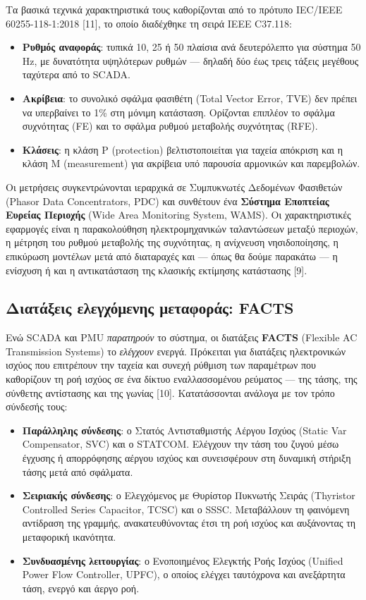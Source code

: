 Τα βασικά τεχνικά χαρακτηριστικά τους καθορίζονται από το πρότυπο IEC/IEEE 60255-118-1:2018 [11],
το οποίο διαδέχθηκε τη σειρά IEEE C37.118:

\begin{itemize}
\item \textbf{Ρυθμός αναφοράς}: τυπικά 10, 25 ή 50 πλαίσια ανά δευτερόλεπτο για σύστημα 50 Hz,
      με δυνατότητα υψηλότερων ρυθμών — δηλαδή δύο έως τρεις τάξεις μεγέθους ταχύτερα από το SCADA.
\item \textbf{Ακρίβεια}: το συνολικό σφάλμα φασιθέτη (Total Vector Error, TVE) δεν πρέπει να
      υπερβαίνει το 1\% στη μόνιμη κατάσταση. Ορίζονται επιπλέον το σφάλμα συχνότητας (FE) και
      το σφάλμα ρυθμού μεταβολής συχνότητας (RFE).
\item \textbf{Κλάσεις}: η κλάση P (protection) βελτιστοποιείται για ταχεία απόκριση και η κλάση M
      (measurement) για ακρίβεια υπό παρουσία αρμονικών και παρεμβολών.
\end{itemize}

Οι μετρήσεις συγκεντρώνονται ιεραρχικά σε Συμπυκνωτές Δεδομένων Φασιθετών (Phasor Data
Concentrators, PDC) και συνθέτουν ένα \textbf{Σύστημα Εποπτείας Ευρείας Περιοχής} (Wide Area
Monitoring System, WAMS). Οι χαρακτηριστικές εφαρμογές είναι η παρακολούθηση ηλεκτρομηχανικών
ταλαντώσεων μεταξύ περιοχών, η μέτρηση του ρυθμού μεταβολής της συχνότητας, η ανίχνευση
νησιδοποίησης, η επικύρωση μοντέλων μετά από διαταραχές και — όπως θα δούμε παρακάτω — η ενίσχυση
ή και η αντικατάσταση της κλασικής εκτίμησης κατάστασης [9].

\subsection{Διατάξεις ελεγχόμενης μεταφοράς: FACTS}

Ενώ SCADA και PMU \emph{παρατηρούν} το σύστημα, οι διατάξεις \textbf{FACTS} (Flexible AC Transmission
Systems) το \emph{ελέγχουν} ενεργά. Πρόκειται για διατάξεις ηλεκτρονικών ισχύος που επιτρέπουν την
ταχεία και συνεχή ρύθμιση των παραμέτρων που καθορίζουν τη ροή ισχύος σε ένα δίκτυο εναλλασσομένου
ρεύματος — της τάσης, της σύνθετης αντίστασης και της γωνίας [10]. Κατατάσσονται ανάλογα με τον
τρόπο σύνδεσής τους:

\begin{itemize}
\item \textbf{Παράλληλης σύνδεσης}: ο Στατός Αντισταθμιστής Αέργου Ισχύος (Static Var Compensator,
      SVC) και ο STATCOM. Ελέγχουν την τάση του ζυγού μέσω έγχυσης ή απορρόφησης αέργου ισχύος και
      συνεισφέρουν στη δυναμική στήριξη τάσης μετά από σφάλματα.
\item \textbf{Σειριακής σύνδεσης}: ο Ελεγχόμενος με Θυρίστορ Πυκνωτής Σειράς (Thyristor Controlled
      Series Capacitor, TCSC) και ο SSSC. Μεταβάλλουν τη φαινόμενη αντίδραση της γραμμής,
      ανακατευθύνοντας έτσι τη ροή ισχύος και αυξάνοντας τη μεταφορική ικανότητα.
\item \textbf{Συνδυασμένης λειτουργίας}: ο Ενοποιημένος Ελεγκτής Ροής Ισχύος (Unified Power Flow
      Controller, UPFC), ο οποίος ελέγχει ταυτόχρονα και ανεξάρτητα τάση, ενεργό και άεργο ροή.
\end{itemize}

